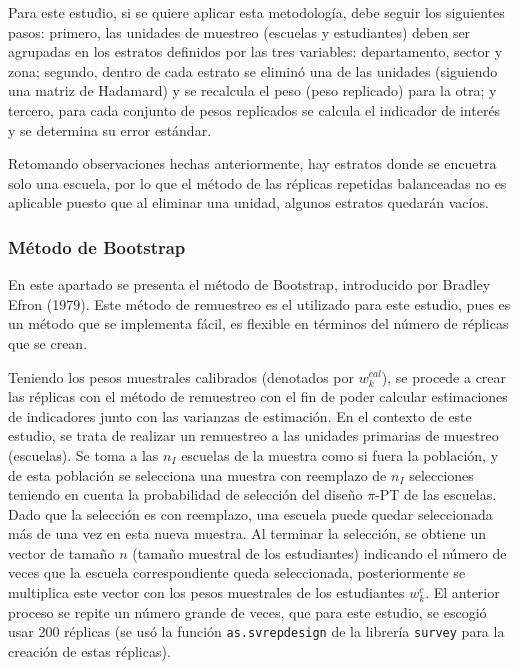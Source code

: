 Para este estudio, si se quiere aplicar esta metodología, debe seguir los siguientes pasos: primero, las unidades de muestreo (escuelas y estudiantes) deben ser agrupadas en los estratos definidos por las tres variables: departamento, sector y zona; segundo, dentro de cada estrato se eliminó una de las unidades (siguiendo una matriz de Hadamard) y se recalcula el peso (peso replicado) para la otra; y tercero, para cada conjunto de pesos replicados se calcula el indicador de interés y se determina su error estándar.

Retomando observaciones hechas anteriormente, hay estratos donde se encuetra solo una escuela, por lo que el método de las réplicas repetidas balanceadas no es aplicable puesto que al eliminar una unidad, algunos estratos quedarán vacíos.

\hypertarget{metodo-de-bootstrap}{%
\subsubsection*{Método de Bootstrap}\label{metodo-de-bootstrap}}


En este apartado se presenta el método de Bootstrap, introducido por Bradley Efron (1979). Este método de remuestreo es el utilizado para este estudio, pues es un método que se implementa fácil, es flexible en términos del número de réplicas que se crean.

Teniendo los pesos muestrales calibrados (denotados por \(w_k^{cal}\)), se procede a crear las réplicas con el método de remuestreo con el fin de poder calcular estimaciones de indicadores junto con las varianzas de estimación. En el contexto de este estudio, se trata de realizar un remuestreo a las unidades primarias de muestreo (escuelas). Se toma a las \(n_I\) escuelas de la muestra como si fuera la población, y de esta población se selecciona una muestra con reemplazo de \(n_I\) selecciones teniendo en cuenta la probabilidad de selección del diseño \(\pi\)-PT de las escuelas. Dado que la selección es con reemplazo, una escuela puede quedar seleccionada más de una vez en esta nueva muestra. Al terminar la selección, se obtiene un vector de tamaño \(n\) (tamaño muestral de los estudiantes) indicando el número de veces que la escuela correspondiente queda seleccionada, posteriormente se multiplica este vector con los pesos muestrales de los estudiantes \(w_k^c\). El anterior proceso se repite un número grande de veces, que para este estudio, se escogió usar 200 réplicas (se usó la función \texttt{as.svrepdesign} de la librería \texttt{survey} para la creación de estas réplicas).

